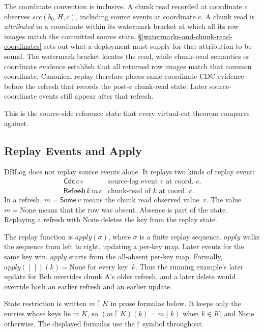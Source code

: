 \documentclass[letterpaper,10pt,twocolumn]{article}
\newcommand{\restrict}{\mathbin{\upharpoonright}}
\newcommand{\Apply}{\mathit{apply}}
\newcommand{\Src}{\mathit{src}}
\newcommand{\None}{\mathrm{None}}
\begin{document}
The coordinate convention is inclusive. A chunk read recorded at
coordinate $c$ observes $\Src(b_0,H,c)$, including
source events at coordinate $c$. A chunk read is \emph{attributed} to
a coordinate within its watermark bracket at which all its row images
match the committed source state.
\S\ref{watermarks-and-chunk-read-coordinates} sets out what a deployment
must supply for that attribution to be sound. The watermark bracket
locates the read, while chunk-read semantics or coordinate evidence
establish that all returned row images match that common
coordinate. Canonical replay therefore
places same-coordinate CDC evidence before the refresh that records the
post-$c$ chunk-read state. Later source-coordinate events still
appear after that refresh.

This is the source-side reference state that every virtual-cut theorem
compares against.

\subsection{Replay Events and Apply}\label{replay-events-and-apply}

DBLog does not replay source events alone. It replays two kinds of
replay event:
\[
  \begin{array}{ll}
    \mathsf{Cdc}\,c\,e & \text{source-log event $e$ at coord.\ $c$,}\\
    \mathsf{Refresh}\,k\,m\,c & \text{chunk-read of $k$ at coord.\ $c$.}
  \end{array}
\]
In a refresh, $m = \mathsf{Some}\,v$ means the chunk read observed
value~$v$. The value $m = \None$ means that the row was absent.
Absence is part of the state. Replaying a refresh
with $\None$ deletes the key from the replay state.

The replay function is $\Apply(\sigma)$, where $\sigma$ is a finite
replay sequence. $\Apply$ walks the sequence from left to right,
updating a per-key map. Later events
for the same key win. $\Apply$ starts from the all-absent per-key
map. Formally, $\Apply([\,])(k) = \None$ for every key~$k$. Thus the running
example's later update for Bob overrides chunk A's older refresh, and
a later delete would override both an earlier refresh and an earlier
update.

State restriction is written $m \restrict K$ in prose formulas
below. It keeps only the entries whose keys lie in $K$, so
$(m \restrict K)(k) = m(k)$ when $k \in K$, and
$\None$ otherwise. The displayed formulas use the
$\restrict$ symbol throughout.
\end{document}
